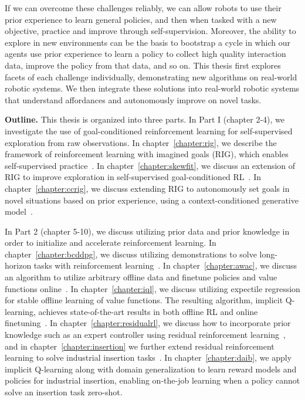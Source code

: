 If we can overcome these challenges reliably, we can allow robots to use their prior experience to learn general policies, and then when tasked with a new objective, practice and improve through self-supervision.
Moreover, the ability to explore in new environments can be the basis to bootstrap a cycle in which our agents use prior experience to learn a policy to collect high quality interaction data, improve the policy from that data, and so on.
This thesis first explores facets of each challenge individually, demonstrating new algorithms on real-world robotic systems.
We then integrate these solutions into real-world robotic systems that understand affordances and autonomously improve on novel tasks.

\vspace{5mm}

\textbf{Outline.} This thesis is organized into three parts. In Part I (chapter 2-4), we investigate the use of goal-conditioned reinforcement learning for self-supervised exploration from raw observations. In chapter~\ref{chapter:rig}, we describe the framework of reinforcement learning with imagined goals (RIG), which enables self-supervised practice~\citep{nair2018rig}. In chapter~\ref{chapter:skewfit}, we discuss an extension of RIG to improve exploration in self-supervised goal-conditioned RL~\citep{pong2019skewfit}. In chapter~\ref{chapter:ccrig}, we discuss extending RIG to autonomously set goals in novel situations based on prior experience, using a context-conditioned generative model~\citep{nair2019ccrig}.

In Part 2 (chapter 5-10), we discuss utilizing prior data and prior knowledge in order to initialize and accelerate reinforcement learning. In chapter~\ref{chapter:bcddpg}, we discuss utilizing demonstrations to solve long-horizon tasks with reinforcement learning~\citep{nair2018demonstrations}. In chapter~\ref{chapter:awac}, we discuss an algorithm to utilize arbitrary offline data and finetune policies and value functions online~\citep{nair2020awac}. In chapter~\ref{chapter:iql}, we discuss utilizing expectile regression for stable offline learning of value functions. The resulting algorithm, implicit Q-learning, achieves state-of-the-art results in both offline RL and online finetuning~\citep{kostrikov2021iql}. In chapter~\ref{chapter:residualrl}, we discuss how to incorporate prior knowledge such as an expert controller using residual reinforcement learning~\citep{johannink18residualrl}, and in chapter~\ref{chapter:insertion} we further extend residual reinforcement learning to solve industrial insertion tasks~\citep{schoettler2019insertion}. In chapter~\ref{chapter:daib}, we apply implicit Q-learning along with domain generalization to learn reward models and policies for industrial insertion, enabling on-the-job learning when a policy cannot solve an insertion task zero-shot. 

